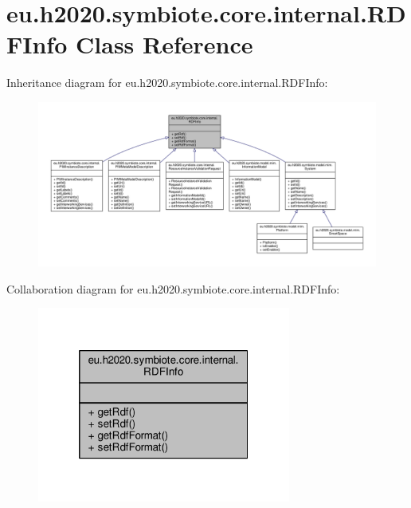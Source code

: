 \hypertarget{classeu_1_1h2020_1_1symbiote_1_1core_1_1internal_1_1RDFInfo}{}\section{eu.\+h2020.\+symbiote.\+core.\+internal.\+R\+D\+F\+Info Class Reference}
\label{classeu_1_1h2020_1_1symbiote_1_1core_1_1internal_1_1RDFInfo}


Inheritance diagram for eu.\+h2020.\+symbiote.\+core.\+internal.\+R\+D\+F\+Info\+:\nopagebreak
\begin{figure}[H]
\begin{center}
\leavevmode
\includegraphics[width=350pt]{classeu_1_1h2020_1_1symbiote_1_1core_1_1internal_1_1RDFInfo__inherit__graph}
\end{center}
\end{figure}


Collaboration diagram for eu.\+h2020.\+symbiote.\+core.\+internal.\+R\+D\+F\+Info\+:\nopagebreak
\begin{figure}[H]
\begin{center}
\leavevmode
\includegraphics[width=236pt]{classeu_1_1h2020_1_1symbiote_1_1core_1_1internal_1_1RDFInfo__coll__graph}
\end{center}
\end{figure}
